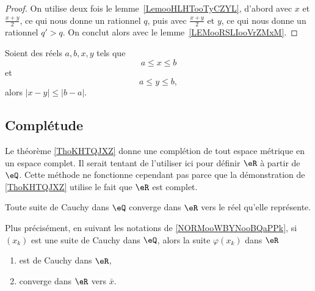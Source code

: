 \begin{proof}
  On utilise deux fois le lemme~\ref{LemooHLHTooTyCZYL}, d'abord avec \( x \) et \( \frac {x+y} 2 \), ce qui nous donne un rationnel \( q \), puis avec \( \frac {x+y} 2 \) et \( y \), ce qui nous donne un rationnel \( q' > q \). On conclut alors avec le lemme~\ref{LEMooRSLIooVrZMxM}.
\end{proof}


\begin{lemma}        \label{LEMooEGYLooCGrDrl}
    Soient des réels \( a,b,x,y\) tels que
    \begin{equation}
        a\leq x\leq b
    \end{equation}
    et
    \begin{equation}
        a\leq y\leq b,
    \end{equation}
    alors \( | x-y |\leq | b-a |\).
\end{lemma}

\subsection{Complétude}


Le théorème \ref{ThoKHTQJXZ} donne une complétion de tout espace métrique en un espace complet. Il serait tentant de l'utiliser ici pour définir \( \eR\) à partir de \( \eQ\). Cette méthode ne fonctionne cependant pas parce que la démonstration de \ref{ThoKHTQJXZ} utilise le fait que \( \eR\) est complet.

\begin{lemma}      \label{LemooRTGFooYVstwS}
    Toute suite de Cauchy dans \( \eQ\) converge dans \( \eR\) vers le réel qu'elle représente.

    Plus précisément, en suivant les notations de \ref{NORMooWBYNooBQaPPk}, si \( (x_k)\) est une suite de Cauchy dans \( \eQ\), alors la suite \( \varphi(x_k)\) dans \( \eR\)
    \begin{enumerate}
        \item
            est de Cauchy dans \( \eR\),
        \item
            converge dans \( \eR\) vers \( \bar x\).
    \end{enumerate}
\end{lemma}

